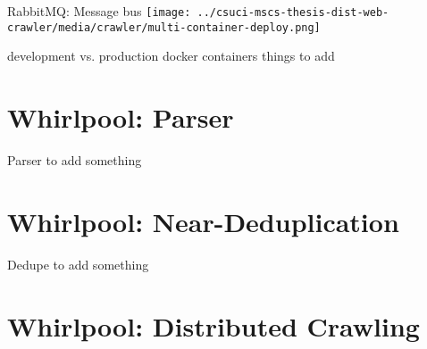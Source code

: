 \documentclass[9pt]{beamer}
\begin{document}

\begin{frame}{RabbitMQ: Message bus}
  \centering
  \texttt{[image: ../csuci-mscs-thesis-dist-web-crawler/media/crawler/multi-container-deploy.png]}
\end{frame}


\begin{frame}{development vs. production docker containers}
  things to add 
\end{frame}


\section[Parser]{Whirlpool: Parser}
\begin{frame}[plain]
\end{frame}


\begin{frame}{Parser}
  to add something
\end{frame}


\section[Deduplication]{Whirlpool: Near-Deduplication}
\begin{frame}[plain]
\end{frame}


\begin{frame}{Dedupe}
  to add something
\end{frame}


\section[Dist. Crawling]{Whirlpool: Distributed Crawling}
\begin{frame}[plain]
\end{frame}
\end{document}
